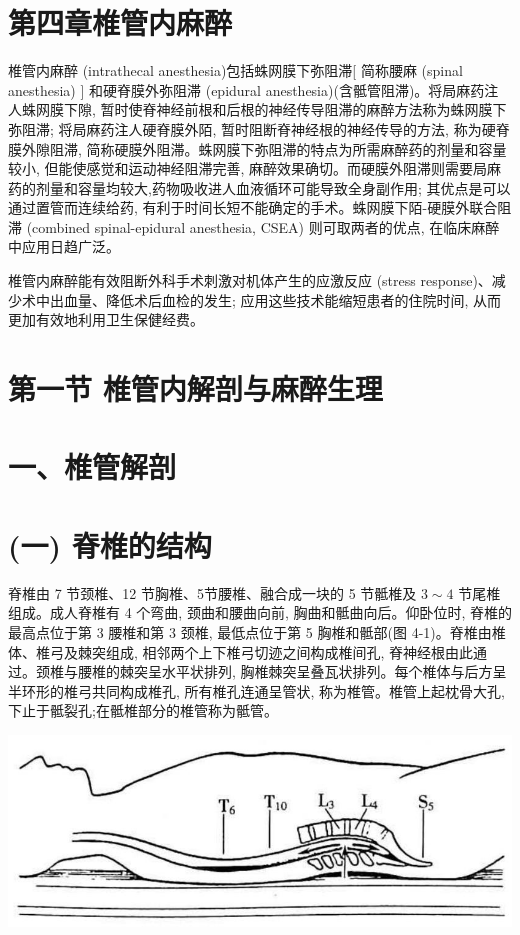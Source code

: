 \documentclass[10pt]{article}
\begin{document}
\section*{第四章椎管内麻醉}
椎管内麻醉 (intrathecal anesthesia)包括蛛网膜下弥阻滞[ 简称腰麻 (spinal anesthesia) ] 和硬脊膜外弥阻滞 (epidural anesthesia)(含骶管阻滞)。将局麻药注人蛛网膜下隙, 暂时使脊神经前根和后根的神经传导阻滞的麻醉方法称为蛛网膜下弥阻滞; 将局麻药注人硬脊膜外陌, 暂时阻断脊神经根的神经传导的方法, 称为硬脊膜外隙阻滞, 简称硬膜外阻滞。蛛网膜下弥阻滞的特点为所需麻醉药的剂量和容量较小, 但能使感觉和运动神经阻滞完善, 麻醉效果确切。而硬膜外阻滞则需要局麻药的剂量和容量均较大,药物吸收进人血液循环可能导致全身副作用; 其优点是可以通过置管而连续给药, 有利于时间长短不能确定的手术。蛛网膜下陌-硬膜外联合阻滞 (combined spinal-epidural anesthesia, CSEA) 则可取两者的优点, 在临床麻醉中应用日趋广泛。

椎管内麻醉能有效阻断外科手术刺激对机体产生的应激反应 (stress response)、减少术中出血量、降低术后血检的发生; 应用这些技术能缩短患者的住院时间, 从而更加有效地利用卫生保健经费。

\section*{第一节 椎管内解剖与麻醉生理}
\section*{一、椎管解剖}
\section*{(一) 脊椎的结构}
脊椎由 7 节颈椎、12 节胸椎、5节腰椎、融合成一块的 5 节骶椎及 $3 \sim 4$ 节尾椎组成。成人脊椎有 4 个弯曲, 颈曲和腰曲向前, 胸曲和骶曲向后。仰卧位时, 脊椎的最高点位于第 3 腰椎和第 3 颈椎, 最低点位于第 5 胸椎和骶部(图 4-1)。脊椎由椎体、椎弓及棘突组成, 相邻两个上下椎弓切迹之间构成椎间孔, 脊神经根由此通过。颈椎与腰椎的棘突呈水平状排列, 胸椎棘突呈叠瓦状排列。每个椎体与后方呈半环形的椎弓共同构成椎孔, 所有椎孔连通呈管状, 称为椎管。椎管上起枕骨大孔,下止于骶裂孔;在骶椎部分的椎管称为骶管。

\begin{center}
\includegraphics[max width=\textwidth]{2024_07_09_002a177993bd97d1d6d7g-058}
\end{center}
\end{document}
